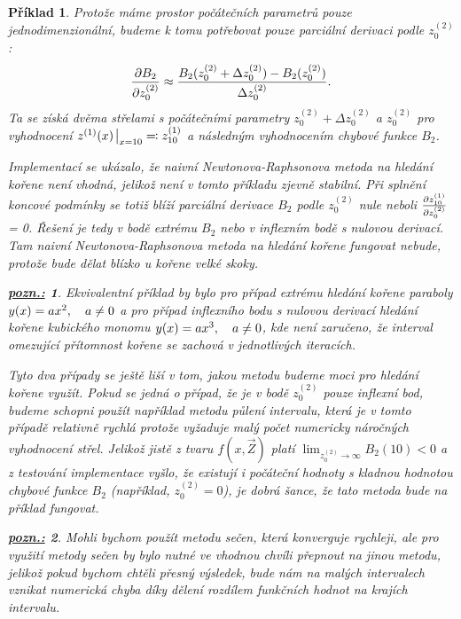 \documentclass{article}
\newtheorem{example}{Příklad}
\newtheorem*{remark}{\underline{\it pozn.:}}
\begin{document}
\begin{example}
	\smallskip

	Protože máme prostor počátečních parametrů pouze jednodimenzionální, budeme k tomu potřebovat pouze parciální derivaci podle $z_{0}^{(2)}$:
	\begin{equation}
		\pdv{B_{2}}{z^{(2)}_{0}} \approx \frac{B_{2}(z^{(2)}_{0} + \Delta z^{(2)}_{0}) - B_{2}(z^{(2)}_{0})}{\Delta z^{(2)}_{0}}.
	\end{equation}
	Ta se získá dvěma střelami s počátečními parametry $z^{(2)}_{0} + \Delta z^{(2)}_{0}$ a $z^{(2)}_{0}$ pro vyhodnocení $z^{(1)}(x)\eval_{x=10} \eqqcolon z^{(1)}_{10}$ a následným vyhodnocením chybové funkce $B_{2}$.

	\bigskip

	Implementací se ukázalo, že naivní Newtonova-Raphsonova metoda na hledání kořene není vhodná, jelikož není v tomto příkladu zjevně stabilní. Při splnění koncové podmínky se totiž blíží parciální derivace $B_{2}$ podle $z^{(2)}_{0}$ nule neboli $\pdv{z^{(1)}_{10}}{z^{(2)}_{0}}$ = 0. Řešení je tedy v bodě extrému $B_{2}$ nebo v inflexním bodě s nulovou derivací. Tam naivní Newtonova-Raphsonova metoda na hledání kořene fungovat nebude, protože bude dělat blízko u kořene velké skoky.
	\begin{remark}
		Ekvivalentní příklad by bylo pro případ extrému hledání kořene paraboly $y(x) = ax^2\qcomma a \neq 0$ a pro případ inflexního bodu s nulovou derivací hledání kořene kubického monomu $y(x) = ax^3\qcomma a \neq 0$, kde není zaručeno, že interval omezující přítomnost kořene se zachová v jednotlivých iteracích.
	\end{remark}

	Tyto dva případy se ještě liší v tom, jakou metodu budeme moci pro hledání kořene využít. Pokud se jedná o případ, že je v bodě $z^{(2)}_{0}$ pouze inflexní bod, budeme schopni použít například metodu půlení intervalu, která je v tomto případě relativně rychlá protože vyžaduje malý počet numericky náročných vyhodnocení střel. Jelikož jistě z tvaru $f(x, \vec{Z})$ platí $\lim_{z^{(2)}_{0} \to \infty} B_{2}(10) < 0$ a z testování implementace vyšlo, že existují i počáteční hodnoty s kladnou hodnotou chybové funkce $B_{2}$ (například, $z^{(2)}_{0} = 0$), je dobrá šance, že tato metoda bude na příklad fungovat.

	\begin{remark}
		Mohli bychom použít metodu sečen, která konverguje rychleji, ale pro využití metody sečen by bylo nutné ve vhodnou chvíli přepnout na jinou metodu, jelikož pokud bychom chtěli přesný výsledek, bude nám na malých intervalech vznikat numerická chyba díky dělení rozdílem funkčních hodnot na krajích intervalu.


\end{remark}
\end{example}
\end{document}
